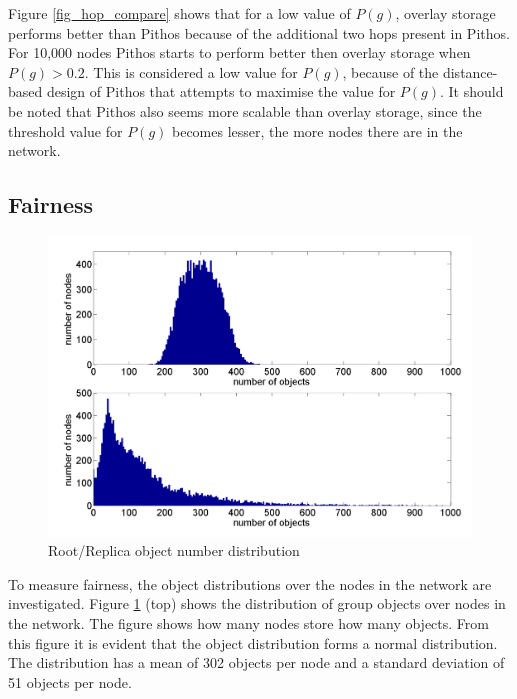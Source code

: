 \documentclass[10pt,a4paper,conference]{IEEEtran}
\begin{document}
Figure \ref{fig_hop_compare} shows that for a low value of $P(g)$, overlay storage performs better than Pithos because of the additional two hops
present in Pithos. For 10,000 nodes Pithos starts to perform better then overlay storage when $P(g) > 0.2$. This is considered a low value for
$P(g)$, because of the distance-based design of Pithos that attempts to maximise the value for $P(g)$. It should be noted that Pithos also seems more
scalable than overlay storage, since the threshold value for $P(g)$ becomes lesser, the more nodes there are in the network.

\subsection{Fairness}
\label{fairness_results}

\begin{figure}[htbp]
 \centering
 \includegraphics[clip=true, viewport=1cm 0.5cm 28.5cm 20cm, width=\columnwidth]{RootRepOverlayObjects}
 \caption{Root/Replica object number distribution}
 \label{fig_group_overlay_objects}
\end{figure}
%
%
To measure fairness, the object distributions over the nodes in the network are investigated. Figure \ref{fig_group_overlay_objects} (top) shows the
distribution of group objects over nodes in the network. The figure shows how many nodes store how many objects. From this figure it is evident that
the object distribution forms a normal distribution. The distribution has a mean of 302 objects per node and a standard deviation of 51 objects per
node.
\end{document}
